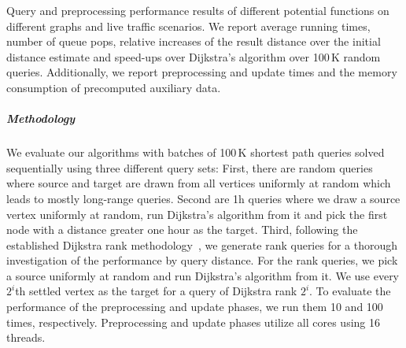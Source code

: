 \documentclass[a4paper,UKenglish,cleveref, autoref, thm-restate,anonymous]{lipics-v2021}
\begin{document}

\begin{table}
\centering
\caption{
Query and preprocessing performance results of different potential functions on different graphs and live traffic scenarios.
We report average running times, number of queue pops, relative increases of the result distance over the initial distance estimate and speed-ups over Dijkstra's algorithm over 100\,K random queries.
Additionally, we report preprocessing and update times and the memory consumption of precomputed auxiliary data.
}\label{tab:pot_perf}

\end{table}

\subparagraph{Methodology}
We evaluate our algorithms with batches of 100\,K shortest path queries solved sequentially using three different query sets:
First, there are random queries where source and target are drawn from all vertices uniformly at random which leads to mostly long-range queries.
Second are 1h queries where we draw a source vertex uniformly at random, run Dijkstra's algorithm from it and pick the first node with a distance greater one hour as the target.
Third, following the established Dijkstra rank methodology~\cite{ss-hhhes-05}, we generate rank queries for a thorough investigation of the performance by query distance.
For the rank queries, we pick a source uniformly at random and run Dijkstra's algorithm from it.
We use every $2^{i}$th settled vertex as the target for a query of Dijkstra rank $2^i$.
To evaluate the performance of the preprocessing and update phases, we run them 10 and 100 times, respectively.
Preprocessing and update phases utilize all cores using 16 threads.
\end{document}
